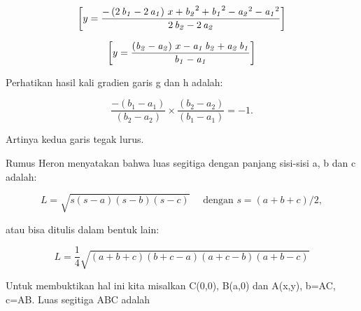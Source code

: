 \documentclass[a4paper,10pt]{article}
\begin{document}
\begin{eulernotebook}
\begin{eulercomment}
\begin{eulercomment}
\begin{eulercomment}
\begin{eulercomment}
\begin{eulercomment}
\begin{eulercomment}
\begin{eulercomment}
\begin{eulercomment}
\begin{eulercomment}
\begin{eulercomment}
\begin{eulercomment}
\begin{eulercomment}
\begin{eulercomment}
\begin{eulercomment}
\begin{eulercomment}
\begin{eulercomment}
\begin{eulercomment}
\begin{eulercomment}
\begin{eulerformula}
\[\left[ y=\frac{-\left(2\,{\it b_1}-2\,{\it a_1}\right)\,x+{\it b_2}  ^2+{\it b_1}^2-{\it a_2}^2-{\it a_1}^2}{2\,{\it b_2}-2\,{\it a_2}}   \right] 
\]
\end{eulerformula}
\begin{eulerformula}
\[
\left[ y=\frac{\left({\it b_2}-{\it a_2}\right)\,x-{\it a_1}\,  {\it b_2}+{\it a_2}\,{\it b_1}}{{\it b_1}-{\it a_1}} \right] 
\]
\end{eulerformula}
\begin{eulercomment}
Perhatikan hasil kali gradien garis g dan h adalah:

\end{eulercomment}
\begin{eulerformula}
\[
\frac{-(b_1-a_1)}{(b_2-a_2)}\times \frac{(b_2-a_2)}{(b_1-a_1)} = -1.
\]
\end{eulerformula}
\begin{eulercomment}
Artinya kedua garis tegak lurus.
\end{eulercomment}
\begin{eulercomment}
Rumus Heron menyatakan bahwa luas segitiga dengan panjang sisi-sisi a,
b dan c adalah:

\end{eulercomment}
\begin{eulerformula}
\[
L = \sqrt{s(s-a)(s-b)(s-c)}\quad \text{ dengan } s=(a+b+c)/2,
\]
\end{eulerformula}
\begin{eulercomment}
atau bisa ditulis dalam bentuk lain:

\end{eulercomment}
\begin{eulerformula}
\[
L = \frac{1}{4}\sqrt{(a+b+c)(b+c-a)(a+c-b)(a+b-c)}
\]
\end{eulerformula}
\begin{eulercomment}
Untuk membuktikan hal ini kita misalkan C(0,0), B(a,0) dan A(x,y),
b=AC, c=AB. Luas segitiga ABC adalah


\end{eulercomment}
\end{eulercomment}
\end{eulercomment}
\end{eulercomment}
\end{eulercomment}
\end{eulercomment}
\end{eulercomment}
\end{eulercomment}
\end{eulercomment}
\end{eulercomment}
\end{eulercomment}
\end{eulercomment}
\end{eulercomment}
\end{eulercomment}
\end{eulercomment}
\end{eulercomment}
\end{eulercomment}
\end{eulercomment}
\end{eulercomment}
\end{eulernotebook}
\end{document}
